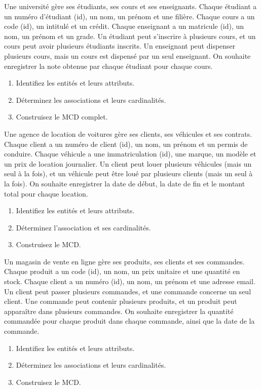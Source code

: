 \exo{}
Une université gère ses étudiants, ses cours et ses enseignants. Chaque étudiant a un numéro d'étudiant (id), un nom, un prénom et une filière. Chaque cours a un code (id), un intitulé et un crédit. Chaque enseignant a un matricule (id), un nom, un prénom et un grade. Un étudiant peut s'inscrire à plusieurs cours, et un cours peut avoir plusieurs étudiants inscrits. Un enseignant peut dispenser plusieurs cours, mais un cours est dispensé par un seul enseignant. On souhaite enregistrer la note obtenue par chaque étudiant pour chaque cours.
\begin{enumerate}
    \item Identifiez les entités et leurs attributs.
    \item Déterminez les associations et leurs cardinalités.
    \item Construisez le MCD complet.
\end{enumerate}

\exo{}
Une agence de location de voitures gère ses clients, ses véhicules et ses contrats. Chaque client a un numéro de client (id), un nom, un prénom et un permis de conduire. Chaque véhicule a une immatriculation (id), une marque, un modèle et un prix de location journalier. Un client peut louer plusieurs véhicules (mais un seul à la fois), et un véhicule peut être loué par plusieurs clients (mais un seul à la fois). On souhaite enregistrer la date de début, la date de fin et le montant total pour chaque location.
\begin{enumerate}
    \item Identifiez les entités et leurs attributs.
    \item Déterminez l'association et ses cardinalités.
    \item Construisez le MCD.
\end{enumerate}

\exo{}
Un magasin de vente en ligne gère ses produits, ses clients et ses commandes. Chaque produit a un code (id), un nom, un prix unitaire et une quantité en stock. Chaque client a un numéro (id), un nom, un prénom et une adresse email. Un client peut passer plusieurs commandes, et une commande concerne un seul client. Une commande peut contenir plusieurs produits, et un produit peut apparaître dans plusieurs commandes. On souhaite enregistrer la quantité commandée pour chaque produit dans chaque commande, ainsi que la date de la commande.
\begin{enumerate}
    \item Identifiez les entités et leurs attributs.
    \item Déterminez les associations et leurs cardinalités.
    \item Construisez le MCD.
\end{enumerate}

